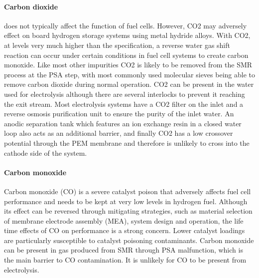 \paragraph{Carbon dioxide} 
does not typically affect the function of fuel cells. However, CO2 may adversely effect on board hydrogen 
storage systems using metal hydride alloys. With CO2, at levels very much higher than the specification, a 
reverse water gas shift reaction can occur under certain conditions in fuel cell systems to create carbon 
monoxide.
Like most other impurities CO2 is likely to be removed from the SMR process at the PSA step, with most 
commonly used molecular sieves being able to remove carbon dioxide during normal operation.
CO2 can be present in the water used for electrolysis although there are several interlocks to prevent 
it reaching the exit stream. Most electrolysis systems have a CO2 filter on the inlet and a reverse osmosis 
purification unit to ensure the purity of the inlet water.  An anodic separation tank which features an ion 
exchange resin in a closed water loop also acts as an additional barrier, and finally CO2 has a low 
crossover potential through the PEM membrane and therefore is unlikely to cross into the cathode side of 
the system.

\paragraph{Carbon monoxide}
Carbon monoxide (CO) is a severe catalyst poison that adversely affects fuel cell performance and needs 
to be kept at very low levels in hydrogen fuel. Although its effect can be reversed through mitigating 
strategies, such as material selection of membrane electrode assembly (MEA), system design and operation, 
the life time effects of CO on performance is a strong concern. Lower catalyst loadings are particularly 
susceptible to catalyst poisoning contaminants.
Carbon monoxide can be present in gas produced from SMR through PSA malfunction, which is the main barrier 
to CO contamination. It is unlikely for CO to be present from electrolysis.

